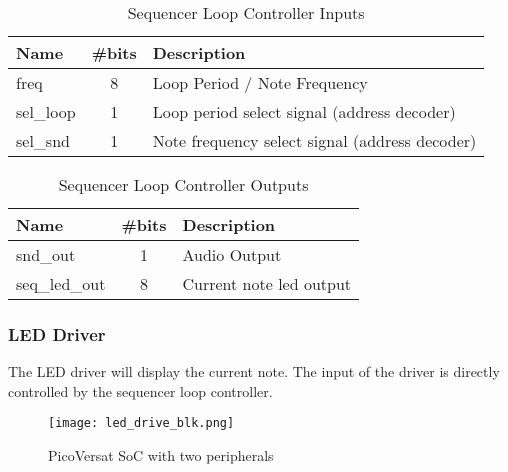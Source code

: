 \begin{table}[!htbp]
    \centering
    \caption{Sequencer Loop Controller Inputs}
    \label{tab:slcIn}
    \begin{tabular}{@{}lcl@{}}
    \toprule
    Name      & \multicolumn{1}{l}{\#bits} & Description                                    \\ \midrule
    freq & 8                          & Loop Period / Note Frequency                                    \\
    sel\_loop & 1                          & Loop period select signal (address decoder)    \\
    sel\_snd  & 1                          & Note frequency select signal (address decoder) \\ \bottomrule
    \end{tabular}
    \end{table}

\begin{table}[!htbp]
    \centering
    \caption{Sequencer Loop Controller Outputs}
    \label{tab:slcOut}
    \begin{tabular}{@{}lcl@{}}
    \toprule
    Name          & \multicolumn{1}{l}{\#bits} & Description             \\ \midrule
    snd\_out      & 1                          & Audio Output            \\
    seq\_led\_out & 8                          & Current note led output \\ \bottomrule
    \end{tabular}
    \end{table}

\subsubsection{LED Driver}

The LED driver will display the current note. The input of the driver is directly controlled by the sequencer loop controller.

\begin{figure}[!htbp]
    \centerline{\texttt{[image: led\_drive\_blk.png]}}
    \vspace{0cm}\caption{PicoVersat SoC with two peripherals}
    \label{fig:periphs}
\end{figure}

